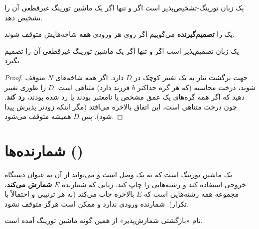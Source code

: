 \begin{corollary}
یک زبان تورینگ-تشخیص‌پذیر است اگر و تنها اگر یک ماشین تورینگ غیرقطعی آن را تشخیص دهد.
\end{corollary}

یک  را \textbf{تصمیم‌گیرنده} می‌گوییم اگر روی هر ورودی \textbf{همه} شاخه‌هایش متوقف شوند.

\begin{corollary}
یک زبان تصمیم‌پذیر است اگر و تنها اگر یک ماشین تورینگ غیرقطعی آن را تصمیم بگیرد.
\end{corollary}
\begin{proof}
جهت برگشت نیاز به یک تغییر کوچک در $D$ دارد. اگر همه شاخه‌های $N$ متوقف شوند، درخت محاسبه (که هر گره حداکثر $b$ فرزند دارد) متناهی است. $D$ را طوری تغییر دهید که اگر همه گره‌های یک عمق مشخص یا نامعتبر بودند یا رد شده بودند، \textbf{رد کند}. چون درخت متناهی است، این اتفاق بالاخره می‌افتد (مگر اینکه زودتر پذیرش پیدا شود). پس $D$ همیشه متوقف می‌شود.
\end{proof}

\section{شمارنده‌ها ()}

\begin{definition}[شمارنده]
 یک ماشین تورینگ است که به یک  وصل است و می‌تواند از آن به عنوان دستگاه خروجی استفاده کند و رشته‌هایی را چاپ کند. زبانی که شمارنده $E$ \textbf{شمارش می‌کند}، مجموعه همه رشته‌هایی است که $E$ بالاخره چاپ می‌کند (به هر ترتیبی و احتمالاً با تکرار). شمارنده ورودی ندارد و ممکن است هرگز متوقف نشود.
\end{definition}

نام «بازگشتی شمارش‌پذیر» از همین گونه ماشین تورینگ آمده است.


